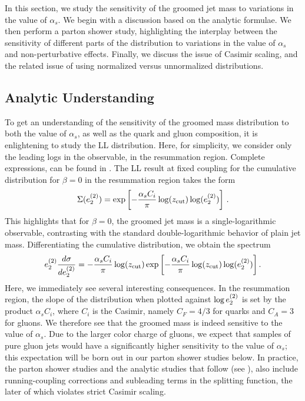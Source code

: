 
In this section, we study the sensitivity of the groomed jet mass to variations in the value of $\alpha_s$.
%
We begin with a discussion based on the analytic formulae.
%
We then perform a parton shower study, highlighting the interplay between the sensitivity of different parts of the distribution to variations in the value of $\alpha_s$ and non-perturbative effects.
%
Finally, we discuss the issue of Casimir scaling, and the related issue of using normalized versus unnormalized distributions.


\subsection{Analytic Understanding}
\label{sec:analytic}

To get an understanding of the sensitivity of the groomed mass distribution to both the value of $\alpha_s$, as well as the quark and gluon composition, it is enlightening to study the LL distribution.
%
Here, for simplicity, we consider only the leading logs in the observable, in the resummation region.
%
Complete expressions, can be found in .
%
The LL result at fixed coupling for the cumulative distribution for $\beta=0$ in the resummation region takes the form
%
\begin{align}
\Sigma(e_{2}^{(2)})=\exp\left[ - \frac{\alpha_s C_i}{\pi} \log(z_{\rm cut}) \log (e_{2}^{(2)}) \right]\,.
\end{align}
%
This highlights that for $\beta=0$, the groomed jet mass is a single-logarithmic observable, contrasting with the standard double-logarithmic behavior of plain jet mass.
%
Differentiating the cumulative distribution, we obtain the spectrum
%
\begin{align}
\label{eq:ecf_ll_dsitribution}
e_{2}^{(2)}  \frac{d\sigma}{d e_{2}^{(2)}}=   - \frac{\alpha_s C_i}{\pi} \log(z_{\rm cut})   \exp\left[ - \frac{\alpha_s C_i}{\pi}  \log(z_{\rm cut}) \log (e_{2}^{(2)}) \right].
\end{align}
%
Here, we immediately see several interesting consequences.
%
In the resummation region, the slope of the distribution when plotted against $\log e_{2}^{(2)}$ is set by the product $\alpha_s C_i$, where $C_i$ is the Casimir, namely $C_F = 4/3$ for quarks and $C_A = 3$ for gluons.
%
We therefore see that the groomed mass is indeed sensitive to the value of $\alpha_s$.
%
Due to the larger color charge of gluons, we expect that samples of pure gluon jets would have a significantly higher sensitivity to the value of $\alpha_s$; this expectation will be born out in our parton shower studies below.
%
In practice, the parton shower studies and the analytic studies that follow (see ), also include running-coupling corrections  and subleading terms in the splitting function, the later of which violates strict Casimir scaling.

